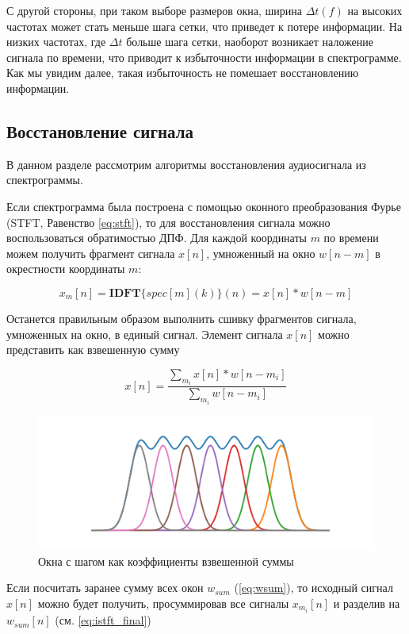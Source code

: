 С другой стороны, при таком выборе размеров окна, ширина $\Delta t(f)$ на высоких частотах может стать меньше шага сетки, что приведет к потере информации.
На низких частотах, где $\Delta t$ больше шага сетки, наоборот возникает наложение сигнала по времени, что приводит к избыточности информации в спектрограмме. 
Как мы увидим далее, такая избыточность не помешает восстановлению информации.


\subsection{Восстановление сигнала}
В данном разделе рассмотрим алгоритмы восстановления аудиосигнала из спектрограммы.

Если спектрограмма была построена с помощью оконного преобразования Фурье (STFT, Равенство \ref{eq:stft}), то для восстановления сигнала можно воспользоваться обратимостью ДПФ.
Для каждой координаты $m$ по времени можем получить фрагмент сигнала $x[n]$, умноженный на окно $w[n-m]$ в окрестности координаты $m$: 

\begin{equation}
  x_m[n] = \textbf{IDFT}\{spec[m](k)\}(n) = x[n]*w[n - m]
  \label{eq:idft}
\end{equation}

Останется правильным образом выполнить сшивку фрагментов сигнала, умноженных на окно, в единый сигнал.
Элемент сигнала $x[n]$ можно представить как взвешенную сумму

\begin{equation}
  x[n] = \frac{\sum_{m_i} x[n]*w[n-m_i]}{\sum_{m_i} w[n-m_i]}
\end{equation}

\begin{figure}
  \centering
  \includegraphics[width=0.8\linewidth]{figures/windows_sum}
  \caption{Окна с шагом как коэффициенты взвешенной суммы}
  \label{fig:windows_sum}
\end{figure}

Если посчитать заранее сумму всех окон $w_{sum}$ (\ref{eq:wsum}), то исходный сигнал $x[n]$ можно будет получить, 
просуммировав все сигналы $x_{m_i}[n]$ и разделив на $w_{sum}[n]$ (см. \ref{eq:istft_final})

